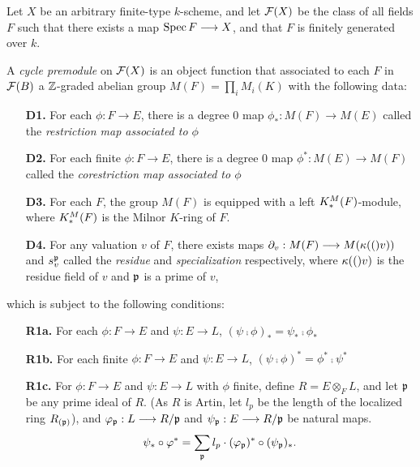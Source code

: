 \begin{defn}\label{def_pre_cycmod}
Let $X$ be an arbitrary finite-type $k$-scheme, and let 
$\mathcal{F}(X)$ be the class of all fields $F$ such that there
exists a map $\mathrm{Spec}\, F \longrightarrow X$, and that $F$ is finitely generated
over $k$.

A \emph{cycle premodule} on $\mathcal{F}(X)$ is an object function
that associated to each $F$ in $\mathcal{F}(B)$ a $\mathbb{Z}$-graded abelian
group $M(F) = \prod_i M_i(K)$ with the following data:

\begin{enumerate}
\item[\textbf{D1.}] For each $\phi: F \to E$, there is a degree 0
map $\phi_*: M(F) \to M(E)$ called the \emph{restriction map 
associated to $\phi$}

\item[\textbf{D2.}] For each finite $\phi: F \to E$, there is a 
degree 0 map $\phi^*: M(E) \to M(F)$ called the \emph{corestriction
map associated to $\phi$}

\item[\textbf{D3.}] For each $F$, the group $M(F)$ is equipped
with a left $K^M_*(F)$-module, where $K^M_*(F)$ is the Milnor
$K$-ring of $F$.

\item[\textbf{D4.}] For any valuation $v$ of $F$, there exists 
maps $\partial_{v}: M(F) \longrightarrow M(\kappa(()v))$ and $s_{v}^{\mathfrak{p}}$
called the \emph{residue} and \emph{specialization} respectively, 
where $\kappa(()v)$ is the residue field of $v$ and $\mathfrak{p}$ is 
a prime of $v$,
\end{enumerate}

which is subject to the following conditions:

\begin{enumerate}
\item[\textbf{R1a.}] For each $\phi: F \to E$ and $\psi: E \to L$,
$(\psi \comp \phi)_* = \psi_* \comp \phi_*$

\item[\textbf{R1b.}] For each finite $\phi: F \to E$ and $\psi: E
\to L$, $(\psi \comp \phi)^* = \phi^* \comp \psi^*$

\item[\textbf{R1c.}] For $\phi: F \to E$ and $\psi: E \to L$ with
$\phi$ finite, define $R = E \otimes_F L$, and let $\mathfrak{p}$
be any prime ideal of $R$. (As $R$ is Artin, let $l_p$ be the 
length of the localized ring $R_{(\mathfrak{p})}$), and 
$\varphi_{\mathfrak{p}}: L \longrightarrow R/{\mathfrak{p}}$ and 
$\psi_{\mathfrak{p}}: E \longrightarrow R/{\mathfrak{p}}$ be natural maps.
\[
\psi_*\circ \varphi^* = \sum_{\mathfrak{p}} l_p \cdot 
(\varphi_{\mathfrak{p}})^* \circ (\psi_{\mathfrak{p}})_*.
\]


\end{enumerate}
\end{defn}
